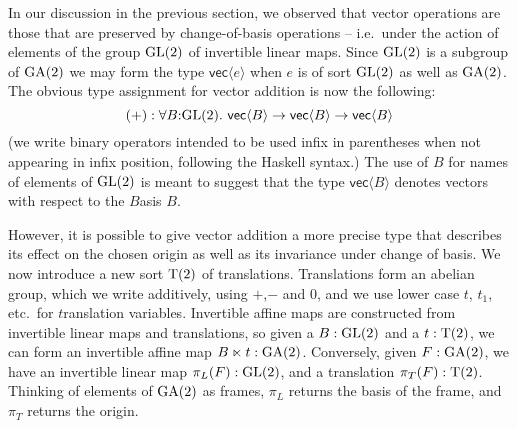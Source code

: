 In our discussion in the previous section, we observed that vector
operations are those that are preserved by change-of-basis operations
-- i.e.~under the action of elements of the group $\mathrm{GL}(2)$ of
invertible linear maps. Since $\mathrm{GL}(2)$ is a subgroup of $\mathrm{GA}(2)$ we
may form the type $\mathsf{vec}\langle e \rangle$ when $e$ is of sort
$\mathrm{GL}(2)$ as well as $\mathrm{GA}(2)$. The obvious type assignment for vector
addition is now the following:
\begin{displaymath}
  (+) : \forall B\mathord:\mathrm{GL}(2).\ \mathsf{vec}\langle B \rangle \to \mathsf{vec}\langle B \rangle \to \mathsf{vec}\langle B \rangle
\end{displaymath}
(we write binary operators intended to be used infix in parentheses
when not appearing in infix position, following the Haskell
syntax.) The use of $B$ for names of elements of $\mathrm{GL}(2)$ is meant to
suggest that the type $\mathsf{vec}\langle B \rangle$ denotes vectors
with respect to the $B$asis $B$.

However, it is possible to give vector addition a more precise type
that describes its effect on the chosen origin as well as its
invariance under change of basis. We now introduce a new sort
$\mathrm{T}(2)$ of translations. Translations form an abelian group,
which we write additively, using $+$,$-$ and $0$, and we use lower
case $t$, $t_1$, etc.~for $t$ranslation variables. Invertible affine
maps are constructed from invertible linear maps and translations, so
given a $B : \mathrm{GL}(2)$ and a $t : \mathrm{T}(2)$, we can form an invertible
affine map $B \ltimes t : \mathrm{GA}(2)$. Conversely, given $F : \mathrm{GA}(2)$, we
have an invertible linear map $\pi_L(F) : \mathrm{GL}(2)$, and a translation
$\pi_T(F) : \mathrm{T}(2)$. Thinking of elements of $\mathrm{GA}(2)$ as frames,
$\pi_L$ returns the basis of the frame, and $\pi_T$ returns the
origin.

